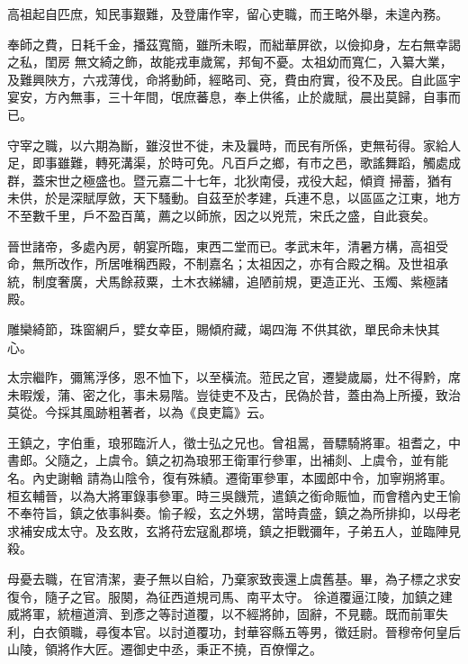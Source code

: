
\begin{pinyinscope}

 高祖起自匹庶，知民事艱難，及登庸作宰，留心吏職，而王略外舉，未遑內務。



 奉師之費，日耗千金，播茲寬簡，雖所未暇，而絀華屏欲，以儉抑身，左右無幸謁之私，閨房
 無文綺之飾，故能戎車歲駕，邦甸不憂。太祖幼而寬仁，入纂大業，及難興陜方，六戎薄伐，命將動師，經略司、兗，費由府實，役不及民。自此區宇宴安，方內無事，三十年間，氓庶蕃息，奉上供徭，止於歲賦，晨出莫歸，自事而已。



 守宰之職，以六期為斷，雖沒世不徙，未及曩時，而民有所係，吏無茍得。家給人足，即事雖難，轉死溝渠，於時可免。凡百戶之鄉，有市之邑，歌謠舞蹈，觸處成群，蓋宋世之極盛也。暨元嘉二十七年，北狄南侵，戎役大起，傾資
 掃蓄，猶有未供，於是深賦厚斂，天下騷動。自茲至於孝建，兵連不息，以區區之江東，地方不至數千里，戶不盈百萬，薦之以師旅，因之以兇荒，宋氏之盛，自此衰矣。



 晉世諸帝，多處內房，朝宴所臨，東西二堂而已。孝武末年，清暑方構，高祖受命，無所改作，所居唯稱西殿，不制嘉名；太祖因之，亦有合殿之稱。及世祖承統，制度奢廣，犬馬餘菽粟，土木衣綈繡，追陋前規，更造正光、玉燭、紫極諸殿。



 雕欒綺節，珠窗網戶，嬖女幸臣，賜傾府藏，竭四海
 不供其欲，單民命未快其心。



 太宗繼阼，彌篤浮侈，恩不恤下，以至橫流。蒞民之官，遷變歲屬，灶不得黔，席未暇煖，蒲、密之化，事未易階。豈徒吏不及古，民偽於昔，蓋由為上所擾，致治莫從。今採其風跡粗著者，以為《良吏篇》云。



 王鎮之，字伯重，琅邪臨沂人，徵士弘之兄也。曾祖暠，晉驃騎將軍。祖耆之，中書郎。父隨之，上虞令。鎮之初為琅邪王衛軍行參軍，出補剡、上虞令，並有能名。內史謝輶
 請為山陰令，復有殊績。遷衛軍參軍，本國郎中令，加寧朔將軍。桓玄輔晉，以為大將軍錄事參軍。時三吳饑荒，遣鎮之銜命賑恤，而會稽內史王愉不奉符旨，鎮之依事糾奏。愉子綏，玄之外甥，當時貴盛，鎮之為所排抑，以母老求補安成太守。及玄敗，玄將苻宏寇亂郡境，鎮之拒戰彌年，子弟五人，並臨陣見殺。



 母憂去職，在官清潔，妻子無以自給，乃棄家致喪還上虞舊基。畢，為子標之求安復令，隨子之官。服闋，為征西道規司馬、南平太守。
 徐道覆逼江陵，加鎮之建威將軍，統檀道濟、到彥之等討道覆，以不經將帥，固辭，不見聽。既而前軍失利，白衣領職，尋復本官。以討道覆功，封華容縣五等男，徵廷尉。晉穆帝何皇后山陵，領將作大匠。遷御史中丞，秉正不撓，百僚憚之。




\end{pinyinscope}
